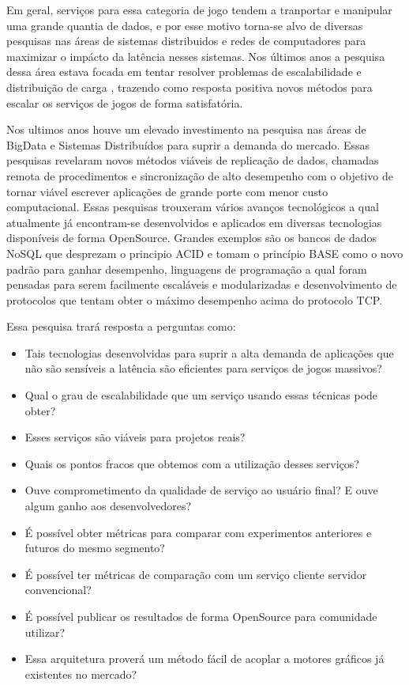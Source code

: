 Em geral, serviços para essa categoria de jogo tendem a tranportar e manipular uma grande quantia de dados, e por esse motivo torna-se alvo de diversas pesquisas nas áreas de sistemas distribuidos e redes de computadores para maximizar o impácto da latência nesses sistemas. Nos últimos anos a pesquisa dessa área estava focada em tentar resolver problemas de escalabilidade e distribuição de carga \cite{load_balance} \cite{kd_tree}, trazendo como resposta positiva novos métodos para escalar os serviços de jogos de forma satisfatória.

Nos ultimos anos houve um elevado investimento na pesquisa nas áreas de BigData e Sistemas Distribuídos para suprir a demanda do mercado. Essas pesquisas revelaram novos métodos viáveis de replicação de dados, chamadas remota de procedimentos e sincronização de alto desempenho com o objetivo de tornar viável escrever aplicações de grande porte com menor custo computacional. Essas pesquisas trouxeram vários avanços tecnológicos a qual atualmente já encontram-se desenvolvidos e aplicados em diversas tecnologias disponíveis de forma OpenSource. Grandes exemplos são os bancos de dados NoSQL que desprezam o principio ACID e tomam o princípio BASE como o novo padrão para ganhar desempenho, linguagens de programação a qual foram pensadas para serem facilmente escaláveis e modularizadas e desenvolvimento de protocolos que tentam obter o máximo desempenho acima do protocolo TCP.

Essa pesquisa trará resposta a perguntas como:

\begin{itemize}
  \item Tais tecnologias desenvolvidas para suprir a alta demanda de aplicações que não são sensíveis a latência são eficientes para serviços de jogos massivos?
  \item Qual o grau de escalabilidade que um serviço usando essas técnicas pode obter?
  \item Esses serviços são viáveis para projetos reais?
  \item Quais os pontos fracos que obtemos com a utilização desses serviços?
  \item Ouve comprometimento da qualidade de serviço ao usuário final? E ouve algum ganho aos desenvolvedores?
  \item É possível obter métricas para comparar com experimentos anteriores e futuros do mesmo segmento?
  \item É possível ter métricas de comparação com um serviço cliente servidor convencional?
  \item É possível publicar os resultados de forma OpenSource para comunidade utilizar?
  \item Essa arquitetura proverá um método fácil de acoplar a motores gráficos já existentes no mercado?
\end{itemize}


